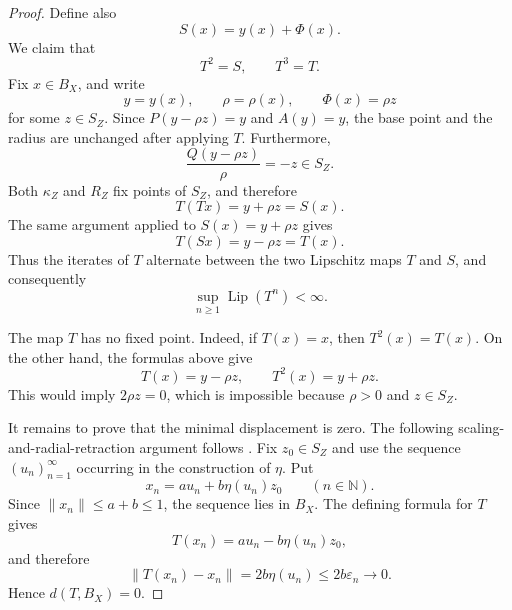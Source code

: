\documentclass[11pt,reqno]{amsart}
\theoremstyle{plain}
\theoremstyle{definition}
\newcommand{\N}{\mathbb N}
\begin{document}
\begin{proof}
Define also
\begin{equation*}
 S(x)=y(x)+\Phi(x).
\end{equation*}
We claim that
\begin{equation*}
 T^2=S,
 \qquad
 T^3=T.
\end{equation*}
Fix $x\in B_X$, and write
\begin{equation*}
 y=y(x),
 \qquad
 \rho=\rho(x),
 \qquad
 \Phi(x)=\rho z
\end{equation*}
for some $z\in S_Z$. Since $P(y-\rho z)=y$ and $A(y)=y$, the base point and the radius are unchanged after applying $T$. Furthermore,
\begin{equation*}
 \frac{Q(y-\rho z)}{\rho}=-z\in S_Z.
\end{equation*}
Both $\kappa_Z$ and $R_Z$ fix points of $S_Z$, and therefore
\begin{equation*}
 T(Tx)=y+\rho z=S(x).
\end{equation*}
The same argument applied to $S(x)=y+\rho z$ gives
\begin{equation*}
 T(Sx)=y-\rho z=T(x).
\end{equation*}
Thus the iterates of $T$ alternate between the two Lipschitz maps $T$ and $S$, and consequently
\begin{equation*}
 \sup_{n\geq1}\operatorname{Lip}(T^n)<\infty.
\end{equation*}

The map $T$ has no fixed point. Indeed, if $T(x)=x$, then $T^2(x)=T(x)$. On the other hand, the formulas above give
\begin{equation*}
 T(x)=y-\rho z,
 \qquad
 T^2(x)=y+\rho z.
\end{equation*}
This would imply $2\rho z=0$, which is impossible because $\rho>0$ and $z\in S_Z$.

It remains to prove that the minimal displacement is zero. The following scaling-and-radial-retraction argument follows \cite[Proposition~4.12]{BarrosoFerreira2026RetractionMethods}. Fix $z_0\in S_Z$ and use the sequence $(u_n)_{n=1}^{\infty}$ occurring in the construction of $\eta$. Put
\begin{equation*}
 x_n=au_n+b\eta(u_n)z_0
 \qquad(n\in\N).
\end{equation*}
Since $\|x_n\|\leq a+b\leq1$, the sequence lies in $B_X$. The defining formula for $T$ gives
\begin{equation*}
 T(x_n)=au_n-b\eta(u_n)z_0,
\end{equation*}
and therefore
\begin{equation*}
 \|T(x_n)-x_n\|
 =2b\eta(u_n)
 \leq2b\varepsilon_n
 \longrightarrow0.
\end{equation*}
Hence $d(T,B_X)=0$.
\end{proof}
\end{document}
